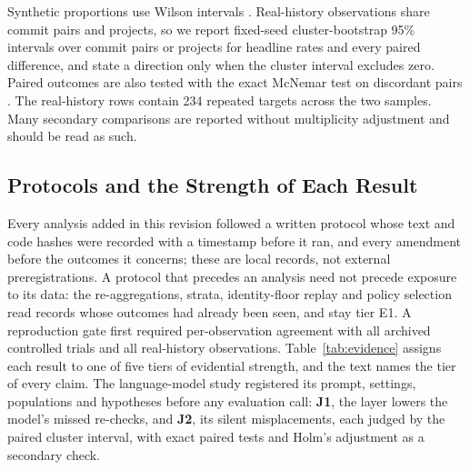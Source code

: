 Synthetic proportions use Wilson intervals \cite{wilson1927probable}. Real-history observations share commit pairs and projects, so we report fixed-seed cluster-bootstrap 95\% intervals over commit pairs or projects for headline rates and every paired difference, and state a direction only when the cluster interval excludes zero. Paired outcomes are also tested with the exact McNemar test on discordant pairs \cite{mcnemar1947note}. The \rN{} real-history rows contain 234 repeated targets across the two samples. Many secondary comparisons are reported without multiplicity adjustment and should be read as such.

\subsection{Protocols and the Strength of Each Result}
Every analysis added in this revision followed a written protocol whose text and code hashes were recorded with a timestamp before it ran, and every amendment before the outcomes it concerns; these are local records, not external preregistrations. A protocol that precedes an analysis need not precede exposure to its data: the re-aggregations, strata, identity-floor replay and policy selection read records whose outcomes had already been seen, and stay tier E1. A reproduction gate first required per-observation agreement with all \nTrialsAll{} archived controlled trials and all \smRealCasAccN{} real-history observations. Table~\ref{tab:evidence} assigns each result to one of five tiers of evidential strength, and the text names the tier of every claim. The language-model study registered its prompt, settings, populations and hypotheses before any evaluation call: \textbf{J1}, the layer lowers the model's missed re-checks, and \textbf{J2}, its silent misplacements, each judged by the paired cluster interval, with exact paired tests and Holm's adjustment as a secondary check.

